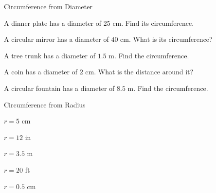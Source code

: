 \begin{practiceBox}{Circumference from Diameter}


\prob A dinner plate has a diameter of $25$ cm. Find its circumference. \answerBlank[3cm]

\prob A circular mirror has a diameter of $40$ cm. What is its circumference? \answerBlank[3cm]

\prob A tree trunk has a diameter of $1.5$ m. Find the circumference. \answerBlank[3cm]

\prob A coin has a diameter of $2$ cm. What is the distance around it? \answerBlank[3cm]

\prob A circular fountain has a diameter of $8.5$ m. Find the circumference. \answerBlank[3cm]

\end{practiceBox}

\begin{practiceBox}[funTeal]{Circumference from Radius}


\prob $r = 5$ cm \answerBlank[3cm]

\prob $r = 12$ in \answerBlank[3cm]

\prob $r = 3.5$ m \answerBlank[3cm]

\prob $r = 20$ ft \answerBlank[3cm]

\prob $r = 0.5$ cm \answerBlank[3cm]

\end{practiceBox}

